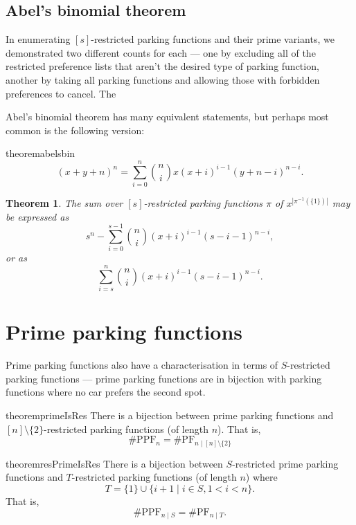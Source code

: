 \documentclass[12 pt]{amsart}
\newtheorem{theorem}{Theorem}[section]
\theoremstyle{definition} %
\theoremstyle{remark} %
\begin{document}
\subsection{Abel's binomial theorem}

In enumerating $[s]$-restricted parking functions and their prime variants, we demonstrated two different counts for each --- one by excluding all of the restricted preference lists that aren't the desired type of parking function, another by taking all parking functions and allowing those with forbidden preferences to cancel. The 

Abel's binomial theorem has many equivalent statements, but perhaps most common is the following version:

\begin{restatable}{theorem}{abelsbin}
	\[
		(x + y + n)^{n} = \sum_{i = 0}^{n} \binom{n}{i} x (x + i)^{i - 1} (y + n - i)^{n - i}.
	\]
\end{restatable}



\begin{theorem}
    \label{thm:res-1s-enumerator}
    The sum over $[s]$-restricted parking functions $\pi$ of $x^{|\pi^{-1}(\{1\})|}$ may be expressed as
    \[s^{n} - \sum_{i = 0}^{s - 1} \binom{n}{i} (x + i)^{i - 1} (s - i - 1)^{n - i},\]
    or as
    \[\sum_{i = s}^{n} \binom{n}{i} (x + i)^{i - 1} (s - i - 1)^{n - i}.\]
\end{theorem}

\section{Prime parking functions}

Prime parking functions also have a characterisation in terms of $S$-restricted parking functions --- prime parking functions are in bijection with parking functions where no car prefers the second spot.

\begin{restatable}{theorem}{primeIsRes}
	There is a bijection between prime parking functions and $[n] \setminus \{ 2 \}$-restricted parking functions (of length $n$). That is,
	\[
		\# \mathrm{PPF}_{n} = \# \mathrm{PF}_{n \mid [n] \setminus \{ 2 \}} 
	\]
\end{restatable}

\begin{restatable}{theorem}{resPrimeIsRes}
	There is a bijection between $S$-restricted prime parking functions and $T$-restricted parking functions (of length $n$) where
	\[
		T = \{ 1 \} \cup \{ i + 1 \mid i \in S, 1 < i < n \}.
	\]
	That is,
	\[
		\# \mathrm{PPF}_{n \mid S} = \# \mathrm{PF}_{n \mid T}.
	\]
\end{restatable}
\end{document}
